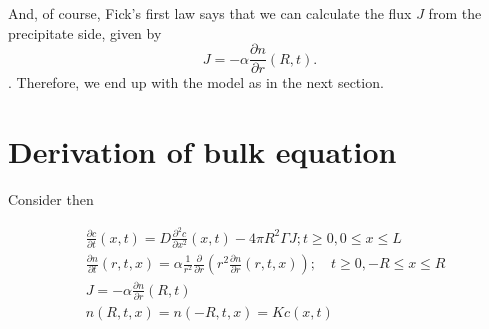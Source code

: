 \documentclass[]{article}
\newcommand{\pderiv}[2]{\frac{\partial #1}{\partial #2}}
\begin{document}
And, of course, Fick's first law says that we can calculate the flux $J$ from the precipitate side, given by
\begin{equation}
	J = -\alpha \pderiv{n}{r}(R,t).
\end{equation}.
Therefore, we end up with the model as in the next section.

\section{Derivation of bulk equation}
Consider then

\begin{equation}\label{originalproblem}
	\begin{split}
	& \pderiv{c}{t}(x,t) = D \frac{\partial^2 c}{\partial x^2}(x,t) - 4 \pi R^2 \Gamma J; t \geq 0, 0 \leq x \leq L\\
	& \pderiv{n}{t}(r,t,x) = \alpha \frac{1}{r^2} \pderiv{}{r} \left( r^2 \pderiv{n}{r}(r,t,x)\right); \quad t \geq 0, -R \leq x \leq R \\
	& J = -\alpha \pderiv{n}{r}(R,t) \\
	& n(R,t,x) = n(-R,t,x) = K c(x,t) \\
	\end{split}
\end{equation}
\end{document}
